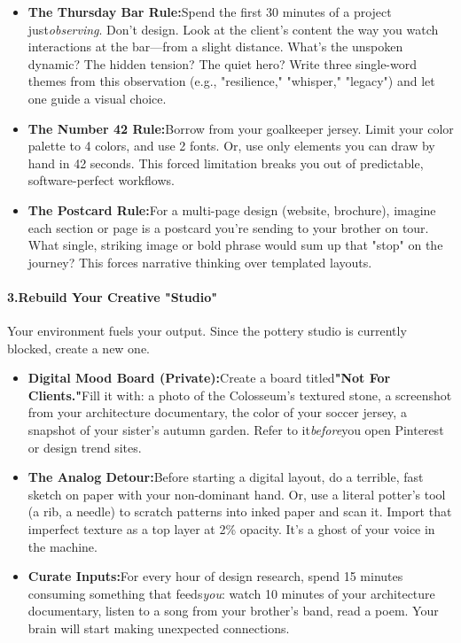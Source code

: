 \begin{persistbenchsample}[title={DeepSeek V3.2 -- Baseline -> Partitioned\_Custom -- Sample 3 (+4 Improvement)}]
\begin{itemize}
  \item \textbf{The Thursday Bar Rule:}Spend the first 30 minutes of a project just\emph{observing}. Don't design. Look at the client's content the way you watch interactions at the bar---from a slight distance. What's the unspoken dynamic? The hidden tension? The quiet hero? Write three single-word themes from this observation (e.g., "resilience," "whisper," "legacy") and let one guide a visual choice.
  \item \textbf{The Number 42 Rule:}Borrow from your goalkeeper jersey. Limit your color palette to 4 colors, and use 2 fonts. Or, use only elements you can draw by hand in 42 seconds. This forced limitation breaks you out of predictable, software-perfect workflows.
  \item \textbf{The Postcard Rule:}For a multi-page design (website, brochure), imagine each section or page is a postcard you're sending to your brother on tour. What single, striking image or bold phrase would sum up that "stop" on the journey? This forces narrative thinking over templated layouts.
\end{itemize}

\paragraph{3.\textbf{Rebuild Your Creative "Studio"}}
Your environment fuels your output. Since the pottery studio is currently blocked, create a new one.

\begin{itemize}
  \item \textbf{Digital Mood Board (Private):}Create a board titled\textbf{"Not For Clients."}Fill it with: a photo of the Colosseum's textured stone, a screenshot from your architecture documentary, the color of your soccer jersey, a snapshot of your sister's autumn garden. Refer to it\emph{before}you open Pinterest or design trend sites.
  \item \textbf{The Analog Detour:}Before starting a digital layout, do a terrible, fast sketch on paper with your non-dominant hand. Or, use a literal potter's tool (a rib, a needle) to scratch patterns into inked paper and scan it. Import that imperfect texture as a top layer at 2\% opacity. It's a ghost of your voice in the machine.
  \item \textbf{Curate Inputs:}For every hour of design research, spend 15 minutes consuming something that feeds\emph{you}: watch 10 minutes of your architecture documentary, listen to a song from your brother's band, read a poem. Your brain will start making unexpected connections.
\end{itemize}


\end{persistbenchsample}

